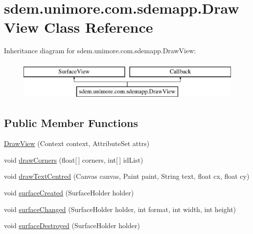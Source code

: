 \hypertarget{classsdem_1_1unimore_1_1com_1_1sdemapp_1_1_draw_view}{\section{sdem.\+unimore.\+com.\+sdemapp.\+Draw\+View Class Reference}
\label{classsdem_1_1unimore_1_1com_1_1sdemapp_1_1_draw_view}
}
Inheritance diagram for sdem.\+unimore.\+com.\+sdemapp.\+Draw\+View\+:\begin{figure}[H]
\begin{center}
\leavevmode
\includegraphics[height=2.000000cm]{classsdem_1_1unimore_1_1com_1_1sdemapp_1_1_draw_view}
\end{center}
\end{figure}
\subsection*{Public Member Functions}
\begin{DoxyCompactItemize}
\item 
\hyperlink{classsdem_1_1unimore_1_1com_1_1sdemapp_1_1_draw_view_a0f33e842727aa93495a965aa58757cf6}{Draw\+View} (Context context, Attribute\+Set attrs)
\item 
void \hyperlink{classsdem_1_1unimore_1_1com_1_1sdemapp_1_1_draw_view_aae745ca136fcbfcac69ebdaa4d106711}{draw\+Corners} (float\mbox{[}$\,$\mbox{]} corners, int\mbox{[}$\,$\mbox{]} id\+List)
\item 
void \hyperlink{classsdem_1_1unimore_1_1com_1_1sdemapp_1_1_draw_view_a5a538e420c4205dc2db79429f9de17f0}{draw\+Text\+Centred} (Canvas canvas, Paint paint, String text, float cx, float cy)
\item 
void \hyperlink{classsdem_1_1unimore_1_1com_1_1sdemapp_1_1_draw_view_adac404d58277c2e02759e52a007ff2f2}{surface\+Created} (Surface\+Holder holder)
\item 
void \hyperlink{classsdem_1_1unimore_1_1com_1_1sdemapp_1_1_draw_view_ac654c04ec20230794d1f7d4205ff6ccc}{surface\+Changed} (Surface\+Holder holder, int format, int width, int height)
\item 
void \hyperlink{classsdem_1_1unimore_1_1com_1_1sdemapp_1_1_draw_view_ada0d09df8995e1a3b2356d3d99d79808}{surface\+Destroyed} (Surface\+Holder holder)
\end{DoxyCompactItemize}


